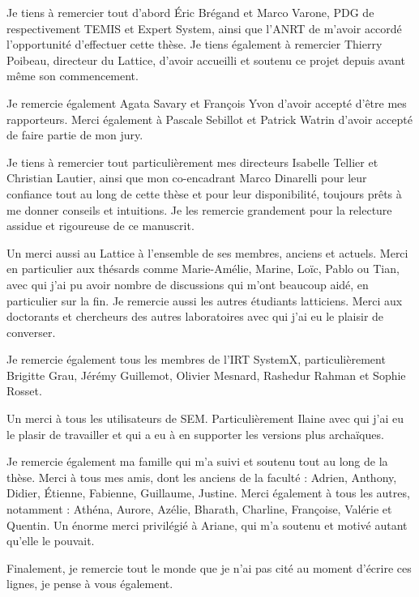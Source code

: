 \documentclass[PhD-Yoann-Dupont.tex]{subfiles}
\begin{document}
Je tiens à remercier tout d'abord Éric Brégand et Marco Varone, PDG de respectivement TEMIS et Expert System, ainsi que l'ANRT de m'avoir accordé l'opportunité d'effectuer cette thèse. Je tiens également à remercier Thierry Poibeau, directeur du Lattice, d'avoir accueilli et soutenu ce projet depuis avant même son commencement.

Je remercie également Agata Savary et François Yvon d'avoir accepté d'être mes rapporteurs. Merci également à Pascale Sebillot et Patrick Watrin d'avoir accepté de faire partie de mon jury.

Je tiens à remercier tout particulièrement mes directeurs Isabelle Tellier et Christian Lautier, ainsi que mon co-encadrant Marco Dinarelli pour leur confiance tout au long de cette thèse et pour leur disponibilité, toujours prêts à me donner conseils et intuitions. Je les remercie grandement pour la relecture assidue et rigoureuse de ce manuscrit.

Un merci aussi au Lattice à l'ensemble de ses membres, anciens et actuels. Merci en particulier aux thésards comme Marie-Amélie, Marine, Loïc, Pablo ou Tian, avec qui j'ai pu avoir nombre de discussions qui m'ont beaucoup aidé, en particulier sur la fin. Je remercie aussi les autres étudiants latticiens. Merci aux doctorants et chercheurs des autres laboratoires avec qui j'ai eu le plaisir de converser.

Je remercie également tous les membres de l'IRT SystemX, particulièrement Brigitte Grau, Jérémy Guillemot, Olivier Mesnard, Rashedur Rahman et Sophie Rosset.

Un merci à tous les utilisateurs de SEM. Particulièrement Ilaine avec qui j'ai eu le plasir de travailler et qui a eu à en supporter les versions plus archaïques.

Je remercie également ma famille qui m'a suivi et soutenu tout au long de la thèse. Merci à tous mes amis, dont les anciens de la faculté : Adrien, Anthony, Didier, Étienne, Fabienne, Guillaume, Justine. Merci également à tous les autres, notamment : Athéna, Aurore, Azélie, Bharath, Charline, Françoise, Valérie et Quentin. Un énorme merci privilégié à Ariane, qui m'a soutenu et motivé autant qu'elle le pouvait.

Finalement, je remercie tout le monde que je n'ai pas cité au moment d'écrire ces lignes, je pense à vous également.
\end{document}
